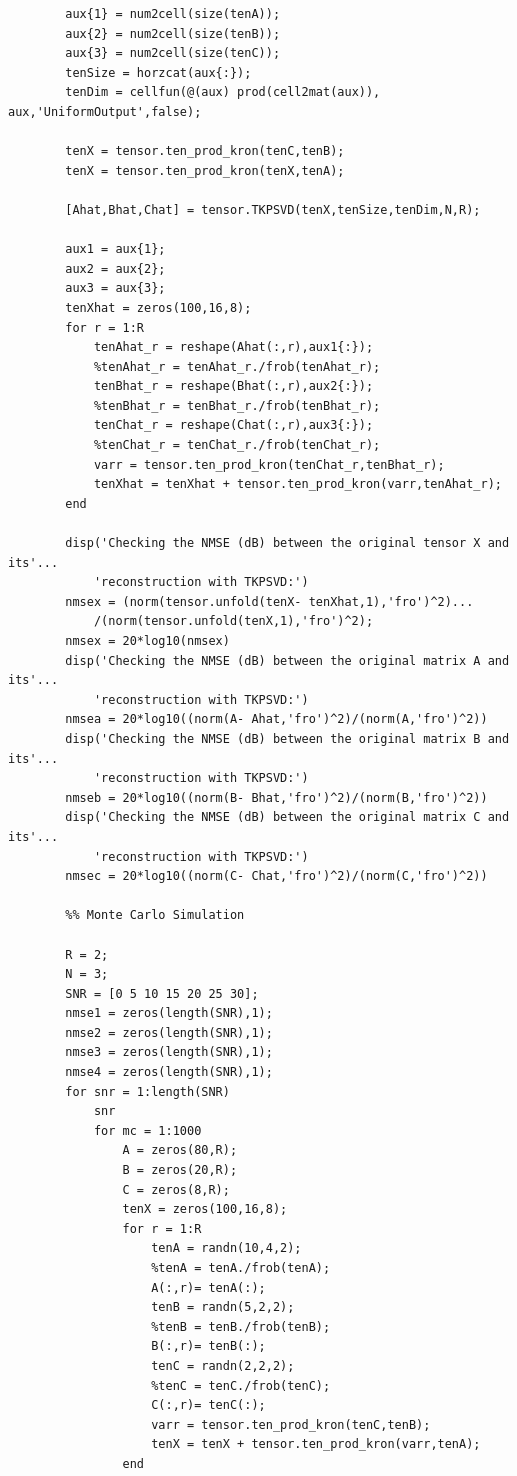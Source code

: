 \documentclass[a4paper,10pt]{article}
\begin{document}
\begin{verbatim}
        aux{1} = num2cell(size(tenA));
        aux{2} = num2cell(size(tenB));
        aux{3} = num2cell(size(tenC));
        tenSize = horzcat(aux{:});
        tenDim = cellfun(@(aux) prod(cell2mat(aux)), aux,'UniformOutput',false);

        tenX = tensor.ten_prod_kron(tenC,tenB);
        tenX = tensor.ten_prod_kron(tenX,tenA);

        [Ahat,Bhat,Chat] = tensor.TKPSVD(tenX,tenSize,tenDim,N,R);

        aux1 = aux{1};
        aux2 = aux{2};
        aux3 = aux{3};
        tenXhat = zeros(100,16,8);
        for r = 1:R
            tenAhat_r = reshape(Ahat(:,r),aux1{:});
            %tenAhat_r = tenAhat_r./frob(tenAhat_r);
            tenBhat_r = reshape(Bhat(:,r),aux2{:});
            %tenBhat_r = tenBhat_r./frob(tenBhat_r);
            tenChat_r = reshape(Chat(:,r),aux3{:});
            %tenChat_r = tenChat_r./frob(tenChat_r);
            varr = tensor.ten_prod_kron(tenChat_r,tenBhat_r);
            tenXhat = tenXhat + tensor.ten_prod_kron(varr,tenAhat_r);
        end

        disp('Checking the NMSE (dB) between the original tensor X and its'...
            'reconstruction with TKPSVD:')
        nmsex = (norm(tensor.unfold(tenX- tenXhat,1),'fro')^2)...
            /(norm(tensor.unfold(tenX,1),'fro')^2);
        nmsex = 20*log10(nmsex)
        disp('Checking the NMSE (dB) between the original matrix A and its'...
            'reconstruction with TKPSVD:')
        nmsea = 20*log10((norm(A- Ahat,'fro')^2)/(norm(A,'fro')^2))
        disp('Checking the NMSE (dB) between the original matrix B and its'...
            'reconstruction with TKPSVD:')
        nmseb = 20*log10((norm(B- Bhat,'fro')^2)/(norm(B,'fro')^2))
        disp('Checking the NMSE (dB) between the original matrix C and its'...
            'reconstruction with TKPSVD:')
        nmsec = 20*log10((norm(C- Chat,'fro')^2)/(norm(C,'fro')^2))

        %% Monte Carlo Simulation

        R = 2;
        N = 3;
        SNR = [0 5 10 15 20 25 30];
        nmse1 = zeros(length(SNR),1);
        nmse2 = zeros(length(SNR),1);
        nmse3 = zeros(length(SNR),1);
        nmse4 = zeros(length(SNR),1);
        for snr = 1:length(SNR)
            snr
            for mc = 1:1000
                A = zeros(80,R);
                B = zeros(20,R);
                C = zeros(8,R);
                tenX = zeros(100,16,8);
                for r = 1:R
                    tenA = randn(10,4,2);
                    %tenA = tenA./frob(tenA);
                    A(:,r)= tenA(:);
                    tenB = randn(5,2,2);
                    %tenB = tenB./frob(tenB);
                    B(:,r)= tenB(:);
                    tenC = randn(2,2,2);
                    %tenC = tenC./frob(tenC);
                    C(:,r)= tenC(:);
                    varr = tensor.ten_prod_kron(tenC,tenB);
                    tenX = tenX + tensor.ten_prod_kron(varr,tenA);
                end


\end{verbatim}
\end{document}
